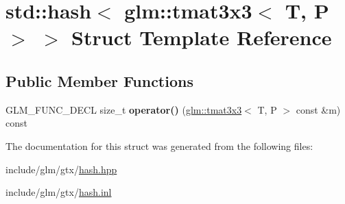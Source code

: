 \hypertarget{structstd_1_1hash_3_01glm_1_1tmat3x3_3_01T_00_01P_01_4_01_4}{}\section{std\+:\+:hash$<$ glm\+:\+:tmat3x3$<$ T, P $>$ $>$ Struct Template Reference}
\label{structstd_1_1hash_3_01glm_1_1tmat3x3_3_01T_00_01P_01_4_01_4}
\subsection*{Public Member Functions}
\begin{DoxyCompactItemize}
\item 
\mbox{\label{structstd_1_1hash_3_01glm_1_1tmat3x3_3_01T_00_01P_01_4_01_4_a035e1905aa65d5416ea5010b33dcd5a9}} 
G\+L\+M\+\_\+\+F\+U\+N\+C\+\_\+\+D\+E\+CL size\+\_\+t {\bfseries operator()} (\hyperlink{structglm_1_1tmat3x3}{glm\+::tmat3x3}$<$ T, P $>$ const \&m) const
\end{DoxyCompactItemize}


The documentation for this struct was generated from the following files\+:\begin{DoxyCompactItemize}
\item 
include/glm/gtx/\hyperlink{hash_8hpp}{hash.\+hpp}\item 
include/glm/gtx/\hyperlink{hash_8inl}{hash.\+inl}\end{DoxyCompactItemize}
